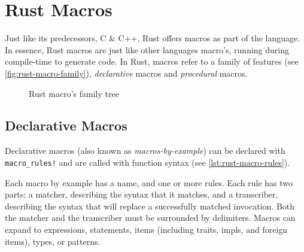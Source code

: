 \section{Rust Macros}\label{sec:rust-macros}

Just like its predecessors, C \& C++, Rust offers macros as part of the language.
In essence, Rust macros are just like other languages macro's, running during compile-time to generate code.
In Rust, macros refer to a family of features (see \autoref{fig:rust-macro-family}),
\emph{declarative} macros and \emph{procedural} macros.

\begin{figure}
    \centering
    \caption{Rust macro's family tree}
    \label{fig:rust-macro-family}
\end{figure}

\subsection{Declarative Macros}\label{sec:rust-macros:decl}

Declarative macros (also known as \emph{macros-by-example}) can be declared with \texttt{macro\_rules!}
and are called with function syntax (see \autoref{lst:rust-macro-rules}).

\begin{displayquote}
    Each macro by example has a name, and one or more rules.
    Each rule has two parts: a matcher, describing the syntax that it matches, and a transcriber,
    describing the syntax that will replace a successfully matched invocation.
    Both the matcher and the transcriber must be surrounded by delimiters.
    Macros can expand to expressions, statements, items
    (including traits, impls, and foreign items), types, or patterns.
\end{displayquote}

